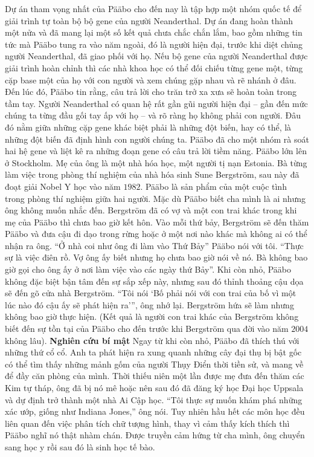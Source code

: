\begin{multicols}{2}
	\vskip 0.1cm
	Dự án tham vọng nhất của Pääbo cho đến nay là tập hợp một nhóm quốc tế để giải trình tự toàn bộ bộ gene của người Neanderthal. Dự án đang hoàn thành một nửa và đã mang lại một số kết quả chưa chắc chắn lắm, bao gồm những tin tức mà Pääbo tung ra vào năm ngoài, đó là người hiện đại, trước khi diệt chủng người Neanderthal, đã giao phối với họ.
	\vskip 0.1cm
	Nếu bộ gene của người Neanderthal được giải trình hoàn chỉnh thì các nhà khoa học có thể đối chiếu từng gene một, từng cặp base một của họ với con người và xem chúng gặp nhau và rẽ nhánh ở đâu. Đến lúc đó, Pääbo tin rằng, câu trả lời cho trăn trở xa xưa sẽ hoàn toàn trong tầm tay.
	\vskip 0.1cm
	Người Neanderthal có quan hệ rất gần gũi người hiện đại -- gần đến mức chúng ta từng đầu gối tay ấp với họ -- và rõ ràng họ không phải con người. Đâu đó nằm giữa những cặp gene khác biệt phải là những đột biến, hay có thể, là những đột biến đã định hình con người chúng ta. Pääbo đã cho một nhóm rà soát hai hệ gene và liệt kê ra những đoạn gene có câu trả lời tiềm năng.
	\vskip 0.1cm
	Pääbo lớn lên ở Stockholm. Mẹ của ông là một nhà hóa học, một người tị nạn Estonia. Bà từng làm việc trong phòng thí nghiệm của nhà hóa sinh Sune Bergström, sau này đã đoạt giải Nobel Y học vào năm $1982$. Pääbo là sản phẩm của một cuộc tình trong phòng thí nghiệm giữa hai người. Mặc dù Pääbo biết cha mình là ai nhưng ông không muốn nhắc đến. Bergström đã có vợ và một con trai khác trong khi mẹ của Pääbo thì chưa bao giờ kết hôn. Vào mỗi thứ bảy, Bergström sẽ đến thăm Pääbo và đưa cậu đi dạo trong rừng hoặc ở một nơi nào khác mà không ai có thể nhận ra ông.
	\vskip 0.1cm
	“Ở nhà coi như ông đi làm vào Thứ Bảy” Pääbo nói với tôi. “Thực sự là việc điên rồ. Vợ ông ấy biết nhưng họ chưa bao giờ nói về nó. Bà không bao giờ gọi cho ông ấy ở nơi làm việc vào các ngày thứ Bảy”. Khi còn nhỏ, Pääbo không đặc biệt bận tâm đến sự sắp xếp này, nhưng sau đó thỉnh thoảng cậu dọa sẽ đến gõ cửa nhà Bergström. “Tôi nói ‘Bố phải nói với con trai của bố vì một lúc nào đó cậu ấy sẽ phát hiện ra’”, ông nhớ lại. Bergström hứa sẽ làm nhưng không bao giờ thực hiện. (Kết quả là người con trai khác của Bergström không biết đến sự tồn tại của Pääbo cho đến trước khi Bergström qua đời vào năm $2004$ không lâu).
	\vskip 0.1cm
	\textbf{\color{timhieukhoahoc}Nghiên cứu bí mật}
	\vskip 0.1cm
	Ngay từ khi còn nhỏ, Pääbo đã thích thú với những thứ cổ cổ. Anh ta phát hiện ra xung quanh những cây đại thụ bị bật gốc có thể tìm thấy những mảnh gốm của người Thụy Điển thời tiền sử, và mang về để đầy căn phòng của mình. Thời thiếu niên một lần được mẹ đưa đến thăm các Kim tự tháp, ông đã bị nó mê hoặc nên sau đó đã đăng ký học Đại học Uppsala và dự định trở thành một nhà Ai Cập học. “Tôi thực sự muốn khám phá những xác ướp, giống như Indiana Jones,” ông nói. Tuy nhiên hầu hết các môn học đều liên quan đến việc phân tích chữ tượng hình, thay vì cảm thấy kích thích thì Pääbo nghĩ nó thật nhàm chán. Được truyền cảm hứng từ cha mình, ông chuyển sang học y rồi sau đó là sinh học tế bào.

\end{multicols}
